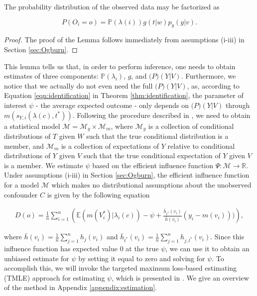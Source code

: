 \documentclass{article}
\begin{document}
\begin{lemma}

The probability distribution of the observed data may be factorized as

$$ P(O_i = o) = \mathbb{P}(\lambda(i)) g(t|w) p_y(y|v).$$
\end{lemma}


\begin{proof}
The proof of the Lemma follows immediately from assumptions (i-iii) in Section \ref{sec:Ogburn}. 
\end{proof}


This lemma tells us that, in order to perform inference, one needs to obtain estimates of three components: $\mathbb{P}(\lambda_i)$, $g$, and $\mathbb(P)(Y|V)$. Furthermore, we notice that we actually do not even need the full $\mathbb(P)(Y|V)$, as, according to Equation \ref{eqn:identification} in Theorem \ref{thm:identification}, the parameter of interest $\psi$ - the average expected outcome - only depends on $\mathbb(P)(Y|V)$ through $m(s_{Y, i}(\lambda(c), t^*))$. Following the procedure described in \cite{Ogburn:Sofrygin:Diaz:vanderLaan:2017}, we need to obtain a statistical model $\mathcal{M} = \mathcal{M}_g \times \mathcal{M}_m$, where $\mathcal{M}_g $ is a collection of conditional distributions of $T$ given $W$ such that the true conditional distribution is a member, and $\mathcal{M}_m$ is a collection of expectations of $Y$ relative to conditional distributions of $Y$ given $V$ such that the true conditional expectation of $Y$ given $V$ is a member. We estimate $\psi$ based on the efficient influence function $\Psi: \mathcal{M} \to \mathbb{R}$. Under assumptions (i-iii) in Section \ref{sec:Ogburn}, the efficient influence function for a model $\mathcal{M}$ which makes no distributional assumptions about the unobserved confounder $C$ is given by the following equation

\begin{align}
\label{eqn:efficient}
D(o) = \frac{1}{n}\sum_{i=1}^n \left(\mathbb{E}(m(V_i^*)| \lambda_i(c)) -\psi + \frac{\bar{h}_{t^*}(v_i)}{\bar{h}(v_i)}(y_i - m(v_i))) \right), 
\end{align}

\noindent  where $\bar{h}(v_i) = \frac{1}{n} \sum_{j=1}^n h_j(v_i)$ and $\bar{h}_{t^*} (v_i) = \frac{1}{n}\sum_{j=1}^n h_{j, t^*}(v_i)$. 
Since this influence function has expected value $0$ at the true $\psi$, we can use it to obtain an unbiased estimate for $\psi$ by setting it equal to zero and solving for $\psi$. To accomplish this, we will invoke the targeted maximum loss-based estimating (TMLE) approach for estimating $\psi$, which is presented in \cite{Ogburn:Sofrygin:Diaz:vanderLaan:2017}. We give an overview of the method in Appendix \ref{appendix:estimation}. 
\end{document}
